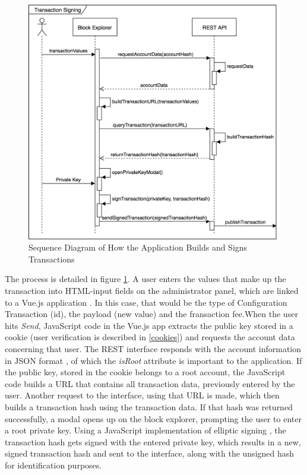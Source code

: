 \begin{figure}
  \includegraphics[scale=0.35]{transactionbuilding.png}
  \centering
  \caption{Sequence Diagram of How the Application Builds and Signs Transactions}
  \label{fig:sequence1}
\end{figure}

The process is detailed in figure \ref{fig:sequence1}. A user enters the values that make up the transaction into HTML-input fields on the administrator panel, which are linked to a Vue.js application \cite{vue} . In this case, that would be the type of Configuration Transaction (id), the payload (new value) and the fransaction fee.When the user hits \emph{Send}, JavaScript code in the Vue.js app extracts the public key stored in a cookie \cite{vcookies} (user verification is described in \ref{cookies}) and requests the account data concerning that user. The REST interface responds with the account information in JSON format \cite{json} , of which the \emph{isRoot} attribute is important to the application. If the public key, stored in the cookie belongs to a root account, the JavaScript code builds a URL that contains all transaction data, previously entered by the user. Another request to the interface, using that URL is made, which then builds a transaction hash using the transaction data. If that hash was returned successfully, a modal opens up on the block explorer, prompting the user to enter a root private key. Using a JavaScript implementation of elliptic signing \cite{elliptic}, the transaction hash gets signed with the entered private key, which results in a new, signed transaction hash and sent to the interface, along with the unsigned hash for identification purposes.

